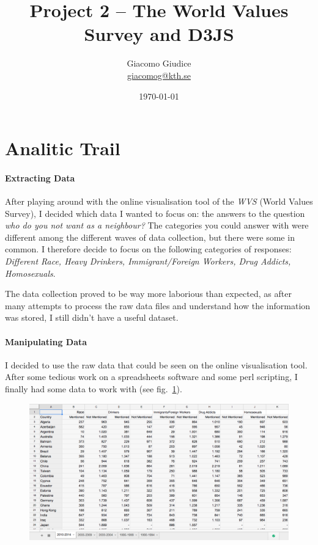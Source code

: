 \documentclass[a4paper,12pt,twoside]{article}
\newcommand{\mail}[1]{{\href{mailto:#1}{#1}}}
\begin{document}
\title{Project 2 -- The World Values Survey and D3JS}
\date{\today}
\author{ Giacomo Giudice\\{ \small \mail{giacomog@kth.se}}}
\maketitle

\baselineskip=16pt
\parindent=15pt
\parskip=5pt

\section*{Analitic Trail}
\paragraph{Extracting Data} After playing around with the online visualisation tool of the {\em WVS} (World Values Survey), I decided which data I wanted to focus on: the answers to the question {\em who do you not want as a neighbour?}
The categories you could answer with were different among the different waves of data collection, but there were some in common.
I therefore decide to focus on the following categories of responses: {\em Different Race, Heavy Drinkers, Immigrant/Foreign Workers, Drug Addicts, Homosexuals}.

The data collection proved to be way more laborious than expected, as after many attempts to process the raw data files and understand how the information was stored,  I still didn't have a useful dataset. 
\paragraph{Manipulating Data} I decided to use the raw data that could be seen on the online visualisation tool.
After some tedious work on a spreadsheets software and some perl scripting, I finally had some data to work with (see fig.~\ref{tab1}).
\begin{figure}[H]
\centering
{
\includegraphics[width=12cm,angle=0]{tabdata1.png}
}
\caption{\label{tab1}}
\end{figure}
\end{document}
